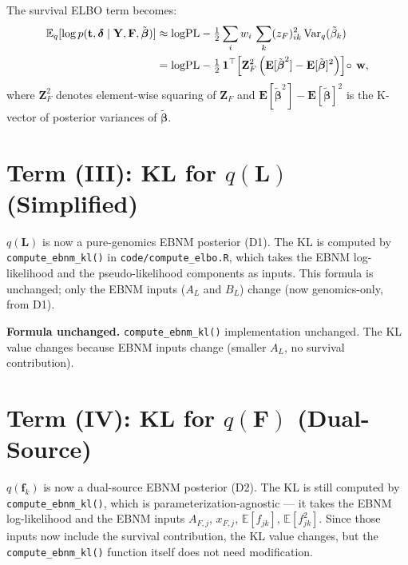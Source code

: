 \documentclass[11pt]{article}
\newcommand{\E}{\mathbb{E}}
\newcommand{\Var}{\mathrm{Var}}
\begin{document}
The survival ELBO term becomes:
\begin{align}
  \E_q[\log p(\mathbf{t}, \boldsymbol\delta \mid \mathbf{Y}, \mathbf{F}, \tilde{\boldsymbol\beta})]
  &\approx \mathrm{logPL}
    - \tfrac{1}{2}\sum_i w_i\,\sum_k (z_F)_{ik}^2\,\Var_q(\tilde\beta_k) \nonumber\\
  &= \mathrm{logPL}
    - \tfrac{1}{2}\,\mathbf{1}^\top\!\left[\mathbf{Z}_F^2\,\Bigl(\mathbf{E}[\tilde{\boldsymbol\beta}^2]
      - \mathbf{E}[\tilde{\boldsymbol\beta}]^2\Bigr)\right]\!\circ\,\mathbf{w},
  \label{eq:surv-elbo-final}
\end{align}
where $\mathbf{Z}_F^2$ denotes element-wise squaring of $\mathbf{Z}_F$ and
$\mathbf{E}[\tilde{\boldsymbol\beta}^2] - \mathbf{E}[\tilde{\boldsymbol\beta}]^2$
is the K-vector of posterior variances of $\tilde{\boldsymbol\beta}$.

\section{Term (III): KL for $q(\mathbf{L})$ (Simplified)}

$q(\mathbf{L})$ is now a pure-genomics EBNM posterior (D1). The KL is computed by
\texttt{compute\_ebnm\_kl()} in \texttt{code/compute\_elbo.R}, which takes the EBNM
log-likelihood and the pseudo-likelihood components as inputs. This formula is unchanged;
only the EBNM inputs ($A_L$ and $B_L$) change (now genomics-only, from D1).

\begin{verifybox}
\textbf{Formula unchanged.} \texttt{compute\_ebnm\_kl()} implementation unchanged.
The KL value changes because EBNM inputs change (smaller $A_L$, no survival contribution).
\end{verifybox}

\section{Term (IV): KL for $q(\mathbf{F})$ (Dual-Source)}

$q(\mathbf{f}_k)$ is now a dual-source EBNM posterior (D2). The KL is still computed
by \texttt{compute\_ebnm\_kl()}, which is parameterization-agnostic — it takes the EBNM
log-likelihood and the EBNM inputs $A_{F,j}$, $x_{F,j}$, $\E[f_{jk}]$, $\E[f_{jk}^2]$.
Since those inputs now include the survival contribution, the KL value changes, but
the \texttt{compute\_ebnm\_kl()} function itself does not need modification.
\end{document}
